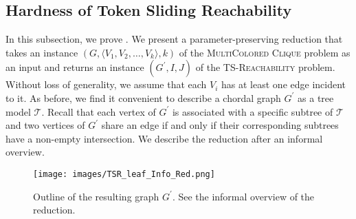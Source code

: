 
\subsection{Hardness of Token Sliding Reachability}
In this subsection, we prove .
We present a parameter-preserving reduction
that takes an instance
$(G,\langle V_1,V_2,\ldots,V_k\rangle, k)$ of the
\textsc{MultiColored Clique} problem as an input and returns an instance
$(G^\prime, I,J)$ of the \textsc{TS-Reachability} problem.
Without loss of generality, we assume that each $V_i$
has at least one edge incident to it.
As before, we find it convenient to describe a chordal graph
$G^\prime$ as a tree model $\mathcal{T}$.
Recall that each vertex of $G^\prime$ is associated
with a specific subtree of
$\mathcal{T}$ and two vertices of $G^\prime$ share
an edge if and only if their corresponding subtrees have a non-empty intersection.
We describe the reduction 
after an informal overview.

\begin{figure}[t]
\centering
\texttt{[image: images/TSR\_leaf\_Info\_Red.png]}
\caption{Outline of the resulting graph $G^{\prime}$. See the informal overview of the reduction.}
\label{TSR_leafW[1]H_Red}
\vspace{-5mm}
\end{figure}


